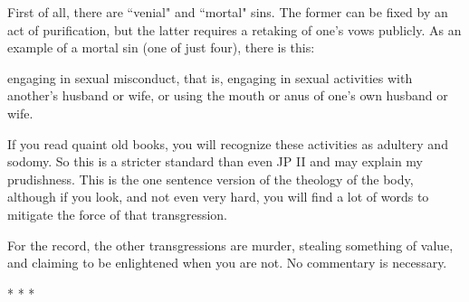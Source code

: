 First of all, there are ``venial" and ``mortal" sins. The former can be fixed by an act of purification, but the latter requires a retaking of one's vows publicly. As an example of a mortal sin (one of just four), there is this:

\begin{quotex}
engaging in sexual misconduct, that is, engaging in sexual activities with another's husband or wife, or using the mouth or anus of one's own husband or wife. 

\end{quotex}
If you read quaint old books, you will recognize these activities as adultery and sodomy. So this is a stricter standard than even JP II and may explain my prudishness. This is the one sentence version of the theology of the body, although if you look, and not even very hard, you will find a lot of words to mitigate the force of that transgression.

For the record, the other transgressions are murder, stealing something of value, and claiming to be enlightened when you are not. No commentary is necessary.




\begin{center}* * *\end{center}

